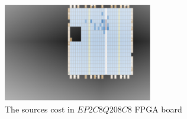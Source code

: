 \begin{figure}
\begin{center}
  \includegraphics[width=6.5cm]{print.eps}
\end{center}
\caption{The sources cost in $EP2C8Q208C8$ FPGA board}
 \label{logic elements}
\end{figure}

